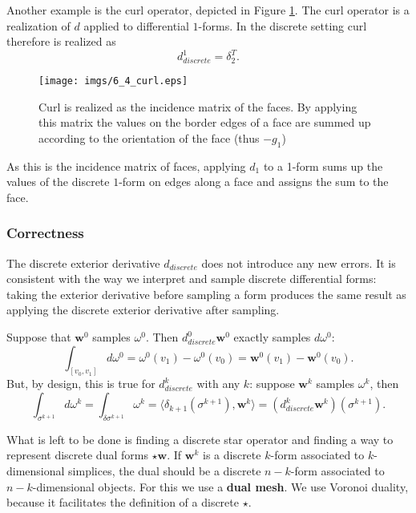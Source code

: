 Another example is the curl operator, depicted in Figure \ref{fig::6_1_curl}. The curl operator is a realization of $d$ applied to differential $1$-forms. In the discrete setting curl therefore is realized as
\[d_{discrete}^1 = \delta_2^T.\]

\begin{figure}[t]
\begin{center}
\texttt{[image: imgs/6\_4\_curl.eps]}
\end{center}
\caption{Curl is realized as the incidence matrix of the faces. By applying this matrix the values on the border edges of a face are summed up according to the orientation of the face (thus $-g_1$)}
\label{fig::6_1_curl}
\end{figure}

\noindent As this is the incidence matrix of faces, applying $d_1$ to a 1-form sums up the values of the discrete $1$-form on edges along a face and assigns the sum to the face. 


\subsubsection{Correctness}

The discrete exterior derivative $d_{discrete}$ does not introduce any new errors. It is consistent with the way we interpret and sample discrete differential forms: taking the exterior derivative before sampling a form produces the same result as applying the discrete exterior derivative after sampling.

Suppose that $\textbf{w}^0$ samples $\omega^0$. Then $d_{discrete}^0 \textbf{w}^0$ exactly samples $d\omega^0$:
\[\int_{[v_0,v_1]} d\omega^0 = \omega^0(v_1) - \omega^0(v_0)= \textbf{w}^0(v_1) - \textbf{w}^0(v_0).\] 
But, by design, this is true for $d_{discrete}^k$ with any $k$: suppose $\textbf{w}^k$ samples $\omega^k$, then
\[\int_{\sigma^{k+1}} d\omega^k  = \int_{\delta \sigma^{k+1}} \omega^k = \langle \delta_{k+1}(\sigma^{k+1}), \textbf{w}^k\rangle = (d_{discrete}^{k} \textbf{w}^k) (\sigma^{k+1}).\]

What is left to be done is finding a discrete star operator and finding a way to represent discrete dual forms $\star \textbf{w}$. If $\textbf{w}^k$ is a discrete $k$-form associated to $k$-dimensional simplices, the dual should be a discrete $n-k$-form associated to $n-k$-dimensional objects. For this we use a \textbf{dual mesh}. We use Voronoi duality, because it facilitates the definition of a discrete $\star$.


